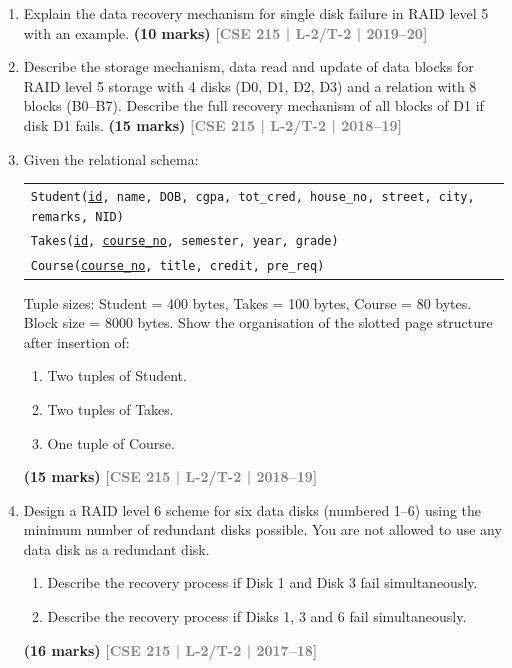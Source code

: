 \documentclass[12pt,a3paper]{article}
\newcommand{\yr}[1]{\hfill\textcolor{gray}{\small\textbf{[#1]}}}
\newcommand{\mk}[1]{\textcolor{orange!70!black}{\small\textbf{(#1 marks)}}}
\begin{document}
\begin{enumerate}
\item Explain the data recovery mechanism for single disk failure in RAID level 5 with an example.
\mk{10} \yr{CSE 215 | L-2/T-2 | 2019--20}

\item Describe the storage mechanism, data read and update of data blocks for RAID level 5 storage with 4 disks (D0, D1, D2, D3) and a relation with 8 blocks (B0--B7). Describe the full recovery mechanism of all blocks of D1 if disk D1 fails.
\mk{15} \yr{CSE 215 | L-2/T-2 | 2018--19}

\item Given the relational schema:
\begin{center}
\begin{tabular}{l}
\texttt{Student(\underline{id}, name, DOB, cgpa, tot\_cred, house\_no, street, city, remarks, NID)}\\
\texttt{Takes(\underline{id}, \underline{course\_no}, semester, year, grade)}\\
\texttt{Course(\underline{course\_no}, title, credit, pre\_req)}
\end{tabular}
\end{center}
Tuple sizes: Student = 400 bytes, Takes = 100 bytes, Course = 80 bytes. Block size = 8000 bytes. Show the organisation of the slotted page structure after insertion of:
\begin{enumerate}
  \item Two tuples of Student.
  \item Two tuples of Takes.
  \item One tuple of Course.
\end{enumerate}
 \mk{15} \yr{CSE 215 | L-2/T-2 | 2018--19}

\item Design a RAID level 6 scheme for six data disks (numbered 1--6) using the minimum number of redundant disks possible. You are not allowed to use any data disk as a redundant disk.
\begin{enumerate}
  \item Describe the recovery process if Disk 1 and Disk 3 fail simultaneously.
  \item Describe the recovery process if Disks 1, 3 and 6 fail simultaneously.
\end{enumerate}
\mk{16} \yr{CSE 215 | L-2/T-2 | 2017--18}


\end{enumerate}
\end{document}
